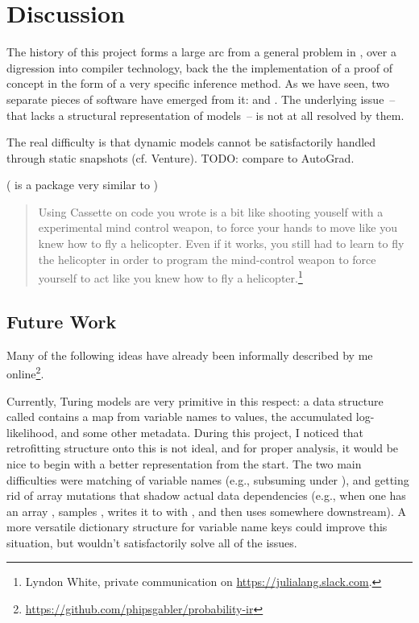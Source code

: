 \chapter{Discussion}
\label{cha:discussion}

The history of this project forms a large arc from a general problem in \turingjl{}, over a
digression into compiler technology, back the the implementation of a proof of concept in the form
of a very specific inference method.  As we have seen, two separate pieces of software have emerged
from it: \irtrackerjl{} and \autogibbsjl{}.  The underlying issue~-- that \turingjl{} lacks a
structural representation of models~-- is not at all resolved by them.

The real difficulty is that dynamic models cannot be satisfactorily handled through static snapshots
(cf. Venture).  TODO: compare to AutoGrad.

( is a package very similar to )
\begin{quote}
  Using Cassette on code you wrote is a bit like shooting youself with a experimental mind control
  weapon, to force your hands to move like you knew how to fly a helicopter. Even if it works, you
  still had to learn to fly the helicopter in order to program the mind-control weapon to force
  yourself to act like you knew how to fly a helicopter.\footnote{Lyndon White, private
    communication on \protect\url{https://julialang.slack.com}.}
\end{quote}




\section{Future Work}
\label{sec:future-work}

Many of the following ideas have already been informally described by me
online\footnote{\protect\url{https://github.com/phipsgabler/probability-ir}}.

Currently, Turing models are very primitive in this respect: a data structure called 
contains a map from variable names to values, the accumulated log-likelihood, and some other
metadata. During this project, I noticed that retrofitting structure onto this is not ideal, and for
proper analysis, it would be nice to begin with a better representation from the start. The two main
difficulties were matching of variable names (e.g., subsuming  under
), and getting rid of array mutations that shadow actual data dependencies (e.g.,
when one has an array , samples , writes it to  with
, and then uses  somewhere downstream).  A more versatile
dictionary structure for variable name keys could improve this situation, but wouldn't
satisfactorily solve all of the issues.


